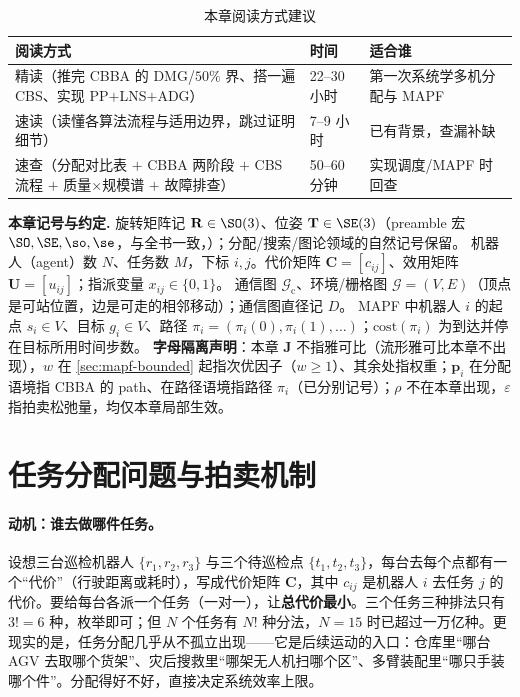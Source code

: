 \begin{table}[H]\centering\small
\caption{本章阅读方式建议}
\label{tab:mapf-reading}
\begin{tabular}{lll}
\toprule
阅读方式 & 时间 & 适合谁 \\
\midrule
精读（推完 CBBA 的 DMG/$50\%$ 界、搭一遍 CBS、实现 PP$+$LNS$+$ADG） & 22--30 小时 & 第一次系统学多机分配与 MAPF \\
速读（读懂各算法流程与适用边界，跳过证明细节） & 7--9 小时 & 已有背景，查漏补缺 \\
速查（分配对比表 $+$ CBBA 两阶段 $+$ CBS 流程 $+$ 质量$\times$规模谱 $+$ 故障排查） & 50--60 分钟 & 实现调度/MAPF 时回查 \\
\bottomrule
\end{tabular}
\end{table}

\begin{note}
\textbf{本章记号与约定.}\;
旋转矩阵记 $\mathbf{R}\in\SO(3)$、位姿 $\mathbf{T}\in\SE(3)$（preamble 宏 $\SO,\SE,\so,\se$，与全书一致，）；分配/搜索/图论领域的自然记号保留。
机器人（agent）数 $N$、任务数 $M$，下标 $i,j$。代价矩阵 $\mathbf{C}=[c_{ij}]$、效用矩阵 $\mathbf{U}=[u_{ij}]$；指派变量 $x_{ij}\in\{0,1\}$。
通信图 $\mathcal{G}_{\mathrm{c}}$、环境/栅格图 $\mathcal{G}=(V,E)$（顶点是可站位置，边是可走的相邻移动）；通信图直径记 $D$。
MAPF 中机器人 $i$ 的起点 $s_i\in V$、目标 $g_i\in V$、路径 $\pi_i=(\pi_i(0),\pi_i(1),\dots)$；$\mathrm{cost}(\pi_i)$ 为到达并停在目标所用时间步数。
\textbf{字母隔离声明}：本章 $\mathbf{J}$ 不指雅可比（流形雅可比本章不出现），$w$ 在 \cref{sec:mapf-bounded} 起指次优因子（$w\ge 1$）、其余处指权重；$\mathbf{p}_i$ 在分配语境指 CBBA 的 path、在路径语境指路径 $\pi_i$（已分别记号）；$\rho$ 不在本章出现，$\varepsilon$ 指拍卖松弛量，均仅本章局部生效。
\end{note}

\section{任务分配问题与拍卖机制}
\label{sec:mapf-assign}

\paragraph{动机：谁去做哪件任务。}
设想三台巡检机器人 $\{r_1,r_2,r_3\}$ 与三个待巡检点 $\{t_1,t_2,t_3\}$，每台去每个点都有一个“代价”（行驶距离或耗时），写成代价矩阵 $\mathbf{C}$，其中 $c_{ij}$ 是机器人 $i$ 去任务 $j$ 的代价。要给每台各派一个任务（一对一），让\textbf{总代价最小}。三个任务三种排法只有 $3!=6$ 种，枚举即可；但 $N$ 个任务有 $N!$ 种分法，$N=15$ 时已超过一万亿种。更现实的是，任务分配几乎从不孤立出现——它是后续运动的入口：仓库里“哪台 AGV 去取哪个货架”、灾后搜救里“哪架无人机扫哪个区”、多臂装配里“哪只手装哪个件”。分配得好不好，直接决定系统效率上限。

